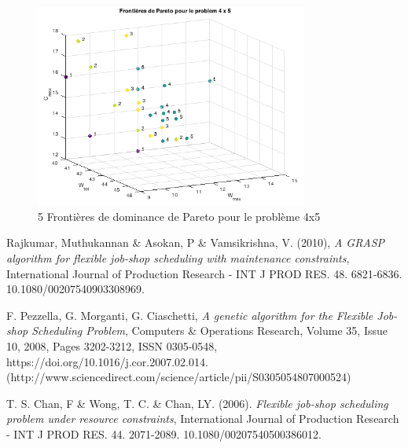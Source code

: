 \documentclass[10pt,a4paper]{scrartcl}
\begin{document}
\begin{figure}
  \centering
  \includegraphics[width=0.8\textwidth]{img/results4x5_Pareto.png}
  \caption{5 Frontières de dominance de Pareto pour le problème 4x5}
\end{figure}

\clearpage

\begin{thebibliography}{1}
   Rajkumar, Muthukannan \& Asokan, P \& Vamsikrishna, V. (2010),
   \emph{A GRASP algorithm for flexible job-shop scheduling with maintenance constraints},
    International Journal of Production Research - INT J PROD RES. 48. 6821-6836. 10.1080/00207540903308969. 

	F. Pezzella, G. Morganti, G. Ciaschetti,
	\emph{A genetic algorithm for the Flexible Job-shop Scheduling Problem},
	Computers \& Operations Research,
	Volume 35, Issue 10,
	2008,
	Pages 3202-3212,
	ISSN 0305-0548,
	https://doi.org/10.1016/j.cor.2007.02.014.
	(http://www.sciencedirect.com/science/article/pii/S0305054807000524)
	
	T. S. Chan, F \& Wong, T. C. \& Chan, LY. (2006). 
	\emph{Flexible job-shop scheduling problem under resource constraints}, 
	International Journal of Production Research - INT J PROD RES. 44. 2071-2089. 10.1080/00207540500386012. 
\end{thebibliography}
\end{document}

